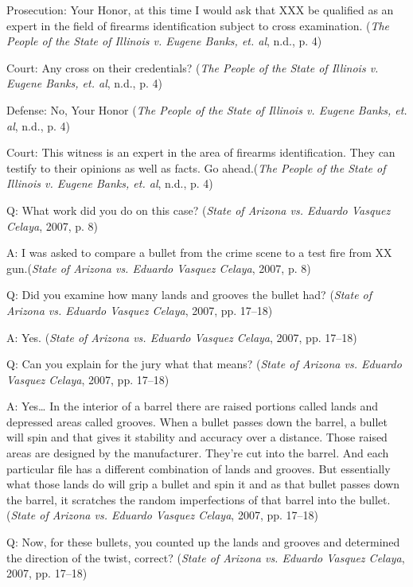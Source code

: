 \documentclass[print]{nuthesis}
\begin{document}
Prosecution: Your Honor, at this time I would ask that XXX be qualified as an expert in the field of firearms identification subject to cross examination. (\emph{The {People} of the {State} of {Illinois} v. Eugene {Banks}, et. al}, n.d., p. 4)

Court: Any cross on their credentials? (\emph{The {People} of the {State} of {Illinois} v. Eugene {Banks}, et. al}, n.d., p. 4)

Defense: No, Your Honor (\emph{The {People} of the {State} of {Illinois} v. Eugene {Banks}, et. al}, n.d., p. 4)

Court: This witness is an expert in the area of firearms identification.
They can testify to their opinions as well as facts.
Go ahead.(\emph{The {People} of the {State} of {Illinois} v. Eugene {Banks}, et. al}, n.d., p. 4)

Q: What work did you do on this case? (\emph{State of {Arizona} vs. Eduardo {Vasquez} {Celaya}}, 2007, p. 8)

A: I was asked to compare a bullet from the crime scene to a test fire from XX gun.(\emph{State of {Arizona} vs. Eduardo {Vasquez} {Celaya}}, 2007, p. 8)

Q: Did you examine how many lands and grooves the bullet had? (\emph{State of {Arizona} vs. Eduardo {Vasquez} {Celaya}}, 2007, pp. 17--18)

A: Yes. (\emph{State of {Arizona} vs. Eduardo {Vasquez} {Celaya}}, 2007, pp. 17--18)

Q: Can you explain for the jury what that means? (\emph{State of {Arizona} vs. Eduardo {Vasquez} {Celaya}}, 2007, pp. 17--18)

A: Yes\ldots{} In the interior of a barrel there are raised portions called lands and depressed areas called grooves.
When a bullet passes down the barrel, a bullet will spin and that gives it stability and accuracy over a distance.
Those raised areas are designed by the manufacturer.
They're cut into the barrel.
And each particular file has a different combination of lands and grooves.
But essentially what those lands do will grip a bullet and spin it and as that bullet passes down the barrel, it scratches the random imperfections of that barrel into the bullet.(\emph{State of {Arizona} vs. Eduardo {Vasquez} {Celaya}}, 2007, pp. 17--18)

Q: Now, for these bullets, you counted up the lands and grooves and determined the direction of the twist, correct? (\emph{State of {Arizona} vs. Eduardo {Vasquez} {Celaya}}, 2007, pp. 17--18)
\end{document}
